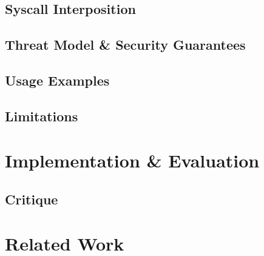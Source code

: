 \documentclass[10pt,twocolumn,letter]{article}
\begin{document}
\subsection{Syscall Interposition}\label{design:syscallinterpos}

\subsection{Threat Model \& Security Guarantees}\label{design:threat}

\subsection{Usage Examples}\label{design:usage}

\subsection{Limitations}

\section{Implementation \& Evaluation}\label{eval}

\subsection{Critique}\label{eval:crit}

\section{Related Work}\label{rel}
\end{document}
